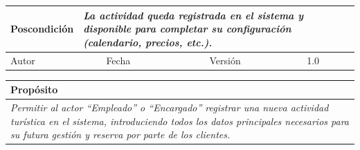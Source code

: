 \begin{table}[H]
\begin{tabular}{llllllll}
        \multicolumn{1}{|l|}{Poscondición}                           & \multicolumn{7}{p{10cm}|}{{\color[HTML]{808080} \textit{La actividad queda registrada en el sistema y disponible para completar su configuración (calendario, precios, etc.).}}}                                                                                                                                                                                                                                                       \\ \hline
        \multicolumn{1}{|l|}{Autor}                                  & \multicolumn{1}{l|}{{\color[HTML]{808080} \textit{}}}                           & \multicolumn{2}{l|}{Fecha}                                                   & \multicolumn{1}{l|}{}                          & \multicolumn{2}{l|}{Versión}                                                      & \multicolumn{1}{l|}{1.0}                                                     \\ \hline
        \end{tabular}
        \end{table}

        \begin{table}[H]
            \begin{tabular}{llllllll}
        \hline
        \multicolumn{8}{|l|}{\cellcolor[HTML]{F2F2F2}Propósito}                                                                                                                                                                                                                                                                                                                                                                                           \\ \hline
        \multicolumn{8}{|p{15cm}|}{{\color[HTML]{808080} \textit{Permitir al actor “Empleado” o “Encargado” registrar una nueva actividad turística en el sistema, introduciendo todos los datos principales necesarios para su futura gestión y reserva por parte de los clientes.}}}                                                                                                                                                                                                             \\ \hline
        \end{tabular}
        \end{table}


